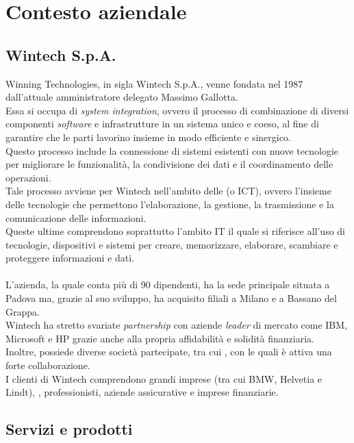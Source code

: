 \chapter{Contesto aziendale}
\label{cap:contestoAziendale}
\section{Wintech S.p.A.}
\noindent Winning Technologies, in sigla Wintech S.p.A., venne fondata nel 1987 dall'attuale amministratore delegato Massimo Gallotta.\\
Essa si occupa di \emph{system integration}, ovvero il processo di combinazione di diversi componenti \emph{software} e infrastrutture in un sistema unico e coeso, al fine di garantire che le parti lavorino insieme in modo efficiente e sinergico.\\
Questo processo include la connessione di sistemi esistenti con nuove tecnologie per migliorare le funzionalità, la condivisione dei dati e il coordinamento delle operazioni.\\
Tale processo avviene per Wintech nell'ambito delle  (o ICT), ovvero l'insieme delle tecnologie che permettono l'elaborazione, la gestione, la trasmissione e la comunicazione delle informazioni.\\
Queste ultime comprendono soprattutto l'ambito \gls{IT} il quale si riferisce all'uso di tecnologie, dispositivi e sistemi per creare, memorizzare, elaborare, scambiare e proteggere informazioni e dati.\\\\
L'azienda, la quale conta più di 90 dipendenti, ha la sede principale situata a Padova ma, grazie al suo sviluppo, ha acquisito filiali a Milano e a Bassano del Grappa.\\
Wintech ha stretto svariate \emph{partnership} con aziende \emph{leader} di mercato come IBM, Microsoft e HP grazie anche alla propria affidabilità e solidità finanziaria.\\ 
Inoltre, possiede diverse società partecipate, tra cui , con le quali è attiva una forte collaborazione.\\
I clienti di Wintech comprendono grandi imprese (tra cui BMW, Helvetia e Lindt), , professionisti, aziende assicurative e imprese finanziarie.\\

\section{Servizi e prodotti}

